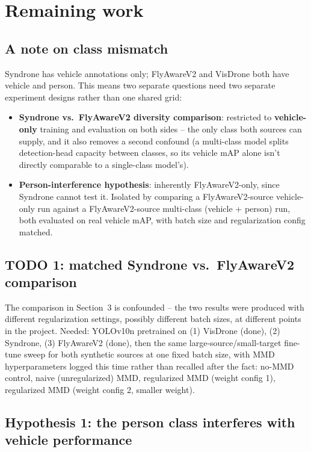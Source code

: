 \documentclass[11pt]{article}
\begin{document}
\section{Remaining work}
\label{sec:todos}

\subsection{A note on class mismatch}

Syndrone has vehicle annotations only; FlyAwareV2 and VisDrone both have vehicle and person.
This means two separate questions need two separate experiment designs rather than one shared
grid:

\begin{itemize}
    \item \textbf{Syndrone vs.\ FlyAwareV2 diversity comparison}: restricted to
    \textbf{vehicle-only} training and evaluation on both sides -- the only class both sources
    can supply, and it also removes a second confound (a multi-class model splits detection-head
    capacity between classes, so its vehicle mAP alone isn't directly comparable to a
    single-class model's).
    \item \textbf{Person-interference hypothesis}: inherently FlyAwareV2-only, since Syndrone
    cannot test it. Isolated by comparing a FlyAwareV2-source vehicle-only run against a
    FlyAwareV2-source multi-class (vehicle + person) run, both evaluated on real vehicle mAP,
    with batch size and regularization config matched.
\end{itemize}

\subsection{TODO 1: matched Syndrone vs.\ FlyAwareV2 comparison}

The comparison in Section~3 is confounded -- the two results were produced with different
regularization settings, possibly different batch sizes, at different points in the project.
Needed: YOLOv10n pretrained on (1) VisDrone (done), (2) Syndrone, (3) FlyAwareV2 (done), then
the same large-source/small-target fine-tune sweep for both synthetic sources at one fixed
batch size, with MMD hyperparameters logged this time rather than recalled after the fact:
no-MMD control, naive (unregularized) MMD, regularized MMD (weight config 1), regularized MMD
(weight config 2, smaller weight).

\subsection{Hypothesis 1: the person class interferes with vehicle performance}
\end{document}
